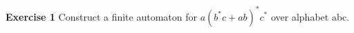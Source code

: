 \documentclass{article}\usepackage[T1]{fontenc}\usepackage{lmodern}
\begin{document}
\textbf{Exercise 1} Construct a finite automaton for $a(b^*c+ab)^*c^*$ over alphabet abc.
\end{document}
